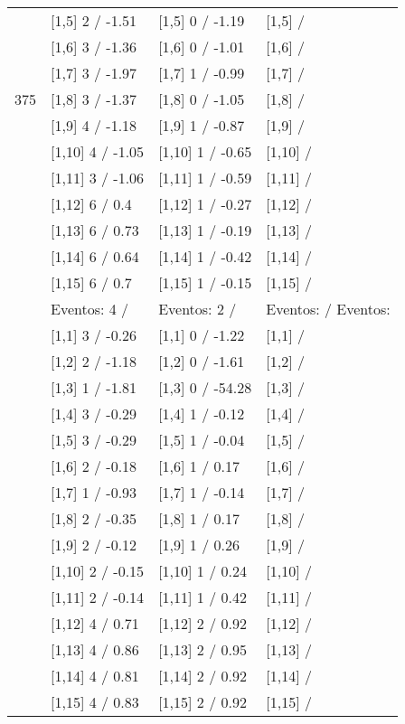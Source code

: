 \begin{table}
\begin{tabular}[t]{llll}
 & {}[1,5] 2  / -1.51 & {}[1,5] 0  / -1.19 & {}[1,5]  /\\
 & {}[1,6] 3  / -1.36 & {}[1,6] 0  / -1.01 & {}[1,6]  /\\
 & {}[1,7] 3  / -1.97 & {}[1,7] 1  / -0.99 & {}[1,7]  /\\
375 & {}[1,8] 3  / -1.37 & {}[1,8] 0  / -1.05 & {}[1,8]  /\\
\addlinespace
 & {}[1,9] 4  / -1.18 & {}[1,9] 1  / -0.87 & {}[1,9]  /\\
 & {}[1,10] 4  / -1.05 & {}[1,10] 1  / -0.65 & {}[1,10]  /\\
 & {}[1,11] 3  / -1.06 & {}[1,11] 1  / -0.59 & {}[1,11]  /\\
 & {}[1,12] 6  / 0.4 & {}[1,12] 1  / -0.27 & {}[1,12]  /\\
 & {}[1,13] 6  / 0.73 & {}[1,13] 1  / -0.19 & {}[1,13]  /\\
\addlinespace
 & {}[1,14] 6  / 0.64 & {}[1,14] 1  / -0.42 & {}[1,14]  /\\
 & {}[1,15] 6  / 0.7 & {}[1,15] 1  / -0.15 & {}[1,15]  /\\
 & Eventos:  4 / & Eventos:  2 / & Eventos:   / Eventos:\\
 & {}[1,1] 3  / -0.26 & {}[1,1] 0  / -1.22 & {}[1,1]  /\\
 & {}[1,2] 2  / -1.18 & {}[1,2] 0  / -1.61 & {}[1,2]  /\\
\addlinespace
 & {}[1,3] 1  / -1.81 & {}[1,3] 0  / -54.28 & {}[1,3]  /\\
 & {}[1,4] 3  / -0.29 & {}[1,4] 1  / -0.12 & {}[1,4]  /\\
 & {}[1,5] 3  / -0.29 & {}[1,5] 1  / -0.04 & {}[1,5]  /\\
 & {}[1,6] 2  / -0.18 & {}[1,6] 1  / 0.17 & {}[1,6]  /\\
 & {}[1,7] 1  / -0.93 & {}[1,7] 1  / -0.14 & {}[1,7]  /\\
\addlinespace
500 & {}[1,8] 2  / -0.35 & {}[1,8] 1  / 0.17 & {}[1,8]  /\\
 & {}[1,9] 2  / -0.12 & {}[1,9] 1  / 0.26 & {}[1,9]  /\\
 & {}[1,10] 2  / -0.15 & {}[1,10] 1  / 0.24 & {}[1,10]  /\\
 & {}[1,11] 2  / -0.14 & {}[1,11] 1  / 0.42 & {}[1,11]  /\\
 & {}[1,12] 4  / 0.71 & {}[1,12] 2  / 0.92 & {}[1,12]  /\\
\addlinespace
 & {}[1,13] 4  / 0.86 & {}[1,13] 2  / 0.95 & {}[1,13]  /\\
 & {}[1,14] 4  / 0.81 & {}[1,14] 2  / 0.92 & {}[1,14]  /\\
 & {}[1,15] 4  / 0.83 & {}[1,15] 2  / 0.92 & {}[1,15]  /\\
\bottomrule
\end{tabular}
\end{table}
